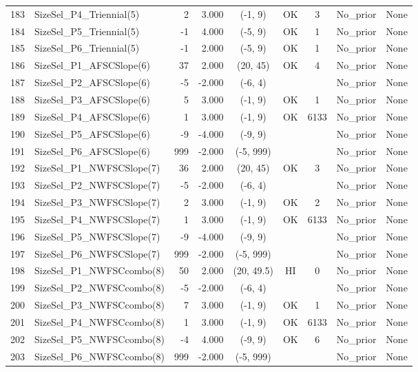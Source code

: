 \documentclass[12pt,]{article}
\begin{document}
\begin{landscape}
\begin{longtable}{rlrrcccll}
  183 & SizeSel\_P4\_Triennial(5) & 2 & 3.000 & (-1, 9) & OK & 3 & No\_prior & None \\ 
  184 & SizeSel\_P5\_Triennial(5) & -1 & 4.000 & (-5, 9) & OK & 1 & No\_prior & None \\ 
  185 & SizeSel\_P6\_Triennial(5) & -1 & 2.000 & (-5, 9) & OK & 1 & No\_prior & None \\ 
  186 & SizeSel\_P1\_AFSCSlope(6) & 37 & 2.000 & (20, 45) & OK & 4 & No\_prior & None \\ 
  187 & SizeSel\_P2\_AFSCSlope(6) & -5 & -2.000 & (-6, 4) &  &  & No\_prior & None \\ 
  188 & SizeSel\_P3\_AFSCSlope(6) & 5 & 3.000 & (-1, 9) & OK & 1 & No\_prior & None \\ 
  189 & SizeSel\_P4\_AFSCSlope(6) & 1 & 3.000 & (-1, 9) & OK & 6133 & No\_prior & None \\ 
  190 & SizeSel\_P5\_AFSCSlope(6) & -9 & -4.000 & (-9, 9) &  &  & No\_prior & None \\ 
  191 & SizeSel\_P6\_AFSCSlope(6) & 999 & -2.000 & (-5, 999) &  &  & No\_prior & None \\ 
  192 & SizeSel\_P1\_NWFSCSlope(7) & 36 & 2.000 & (20, 45) & OK & 3 & No\_prior & None \\ 
  193 & SizeSel\_P2\_NWFSCSlope(7) & -5 & -2.000 & (-6, 4) &  &  & No\_prior & None \\ 
  194 & SizeSel\_P3\_NWFSCSlope(7) & 2 & 3.000 & (-1, 9) & OK & 2 & No\_prior & None \\ 
  195 & SizeSel\_P4\_NWFSCSlope(7) & 1 & 3.000 & (-1, 9) & OK & 6133 & No\_prior & None \\ 
  196 & SizeSel\_P5\_NWFSCSlope(7) & -9 & -4.000 & (-9, 9) &  &  & No\_prior & None \\ 
  197 & SizeSel\_P6\_NWFSCSlope(7) & 999 & -2.000 & (-5, 999) &  &  & No\_prior & None \\ 
  198 & SizeSel\_P1\_NWFSCcombo(8) & 50 & 2.000 & (20, 49.5) & HI & 0 & No\_prior & None \\ 
  199 & SizeSel\_P2\_NWFSCcombo(8) & -5 & -2.000 & (-6, 4) &  &  & No\_prior & None \\ 
  200 & SizeSel\_P3\_NWFSCcombo(8) & 7 & 3.000 & (-1, 9) & OK & 1 & No\_prior & None \\ 
  201 & SizeSel\_P4\_NWFSCcombo(8) & 1 & 3.000 & (-1, 9) & OK & 6133 & No\_prior & None \\ 
  202 & SizeSel\_P5\_NWFSCcombo(8) & -4 & 4.000 & (-9, 9) & OK & 6 & No\_prior & None \\ 
  203 & SizeSel\_P6\_NWFSCcombo(8) & 999 & -2.000 & (-5, 999) &  &  & No\_prior & None \\ 

\end{longtable}
\end{landscape}
\end{document}

